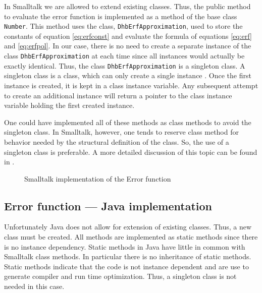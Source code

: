 \documentclass[twoside]{book}
\begin{document}
In Smalltalk we are allowed to extend existing classes. Thus, the
public method to evaluate the error function is implemented as a
method of the base class {\tt Number}. This method uses the class,
{\tt DhbErfApproximation}, used to store the constants of equation
\ref{eq:erfconst} and evaluate the formula of equations
\ref{eq:erf} and \ref{eq:erfpol}. In our case, there is no need to
create a separate instance of the class {\tt DhbErfApproximation}
at each time since all instances would actually be exactly
identical. Thus, the class {\tt DhbErfApproximation} is a
singleton class. A singleton class is a class, which can only
create a single instance \cite{GoF}. Once the first instance is
created, it is kept in a class instance variable. Any subsequent
attempt to create an additional instance will return a pointer to
the class instance variable holding the first created instance.

One could have implemented all of these methods as class methods
to avoid the singleton class. In Smalltalk, however, one tends to
reserve class method for behavior needed by the structural
definition of the class. So, the use of a singleton class is
preferable. A more detailed discussion of this topic can be found
in \cite{StDesPat}.

\begin{figure}
\begin{listing}
\caption{Smalltalk implementation of the Error function}
\label{ls:errorFunction}


\end{listing}
\end{figure}

\subsection{Error function --- Java implementation}
 Unfortunately Java does not allow for
extension of existing classes. Thus, a new class must be created.
All methods are implemented as static methods since there is no
instance dependency. Static methods in Java have little in common
with Smalltalk class methods. In particular there is no
inheritance of static methods. Static methods indicate that the
code is not instance dependent and are use to generate compiler
and run time optimization. Thus, a singleton class is not needed
in this case.
\end{document}
